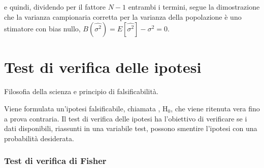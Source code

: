 \documentclass[letterpaper,10pt,italian]{jupyterBook}
\begin{document}
\sphinxAtStartPar
e quindi, dividendo per il fattore \(N-1\) entrambi i termini, segue la dimostrazione che la varianza campionaria corretta per la varianza della popolazione è uno stimatore con bias nullo, \(B(\hat{\sigma^2}) = E[\hat{\sigma^2}] - \sigma^2 = 0\).



\sphinxstepscope


\section{Test di verifica delle ipotesi}
\label{\detokenize{ch/statistics/hp-test:test-di-verifica-delle-ipotesi}}\label{\detokenize{ch/statistics/hp-test:statistics-hs-inference-hp-test}}\label{\detokenize{ch/statistics/hp-test::doc}}
\sphinxAtStartPar
{} Filosofia della scienza e principio di falsificabilità.

\sphinxAtStartPar
{} Viene formulata un’ipotesi falsificabile, chiamata , \(\text{H}_{0}\), che viene ritenuta vera fino a prova contraria. Il test di verifica delle ipotesi ha l’obiettivo di verificare se i dati disponibili, riassunti in una variabile test, possono smentire l’ipotesi con una probabilità desiderata.
\subsubsection*{Test di verifica di Fisher}
\end{document}
